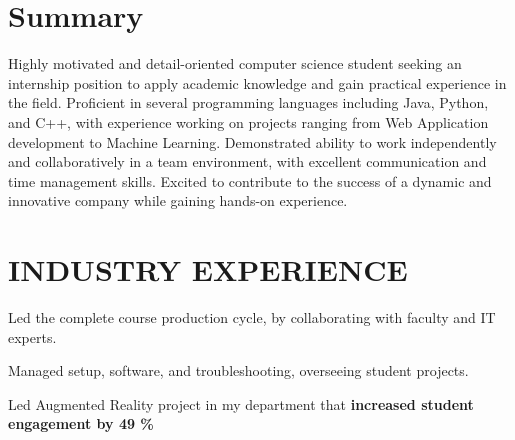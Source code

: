 \documentclass[a4paper]{deedy-resume} %
\begin{document}
\hfill
%
%
\begin{minipage}[t]{0.66\textwidth} %

\section{Summary}
Highly motivated and detail-oriented computer science student seeking an internship position to apply academic knowledge and gain practical experience in the field. Proficient in several programming languages including Java, Python, and C++, with experience working on projects ranging from Web Application development to Machine Learning. Demonstrated ability to work independently and collaboratively in a team environment, with excellent communication and time management skills. Excited to contribute to the success of a dynamic and innovative company while gaining hands-on experience.
\sectionspace

\section{INDUSTRY EXPERIENCE}


\vspace{\topsep} 

\begin{tightitemize}
\item Led the complete course production cycle, by collaborating with faculty and IT experts.
\item Managed setup, software, and troubleshooting, overseeing student projects.
\item Led Augmented Reality project in my department that \textbf{increased student engagement by 49 \%}
\end{tightitemize}

\sectionspace 


\end{minipage}
\end{document}
